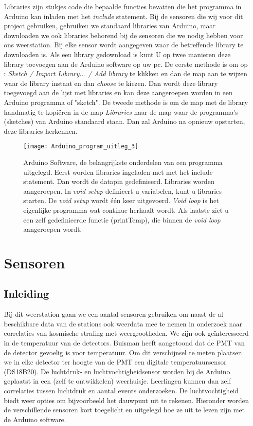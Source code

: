 Libraries zijn stukjes code die bepaalde functies bevatten die het
programma in Arduino kan inladen met het \emph{include} statement. Bij
de sensoren die wij voor dit project gebruiken, gebruiken we standaard
libraries van Arduino, maar downloaden we ook libraries behorend bij de
sensoren die we nodig hebben voor ons weerstation. Bij elke sensor wordt
aangegeven waar de betreffende library te downloaden is. Als een library
gedownload is kunt U op twee manieren deze library toevoegen aan de
Arduino software op uw pc. De eerste methode is om op : \emph{Sketch /
Import Library... / Add library} te klikken en dan de map aan te wijzen
waar de library instaat en dan \emph{choose} te kiezen. Dan wordt deze
library toegevoegd aan de lijst met libraries en kan deze aangeroepen
worden in een Arduino programma of "sketch". De tweede methode is om de
map met de library handmatig te kopi\"{e}ren in de map \emph{Libraries}
naar de map waar de programma's (sketches) van Arduino standaard staan.
Dan zal Arduino na opnieuw opstarten, deze libraries herkennen. 


\begin{figure}
    \centering
    \texttt{[image: Arduino\_program\_uitleg\_3]}
    \caption{Arduino Software, de belangrijkste onderdelen van een 
    programma uitgelegd. Eerst worden libraries ingeladen met 
    met het include statement. Dan wordt de datapin gedefinieerd.
    Libraries worden aangeroepen. In \emph{void setup} definieert u variabelen, 
    kunt u libraries starten. De \emph{void setup} wordt één keer uitgevoerd. 
    \emph{Void loop} is het eigenlijke programma wat continue herhaalt wordt. 
    Als laatste ziet u een zelf gedefinieerde functie (printTemp), die binnen 
    de \emph{void loop} aangeroepen wordt.}
   \label{fig:Arduino_program_uitleg_3}
\end{figure}


\section{Sensoren}

\subsection{Inleiding}

Bij dit weerstation gaan we een aantal sensoren gebruiken om naast de al
beschikbare data van de \hisparc stations ook weerdata mee te nemen in
onderzoek naar correlaties van kosmische straling met weergrootheden. We
zijn ook ge\"{i}nteresseerd in de temperatuur van de detectors.
Buisman \cite{Buisman} heeft aangetoond dat de PMT van de detector gevoelig is
voor temperatuur. Om dit verschijnsel te meten plaatsen we in elke detector 
ter hoogte van de PMT een digitale temperatuursensor (DS18B20). De luchtdruk- 
en luchtvochtigheidsensor worden bij de Arduino geplaatst in een (zelf te
ontwikkelen) weerhuisje. Leerlingen kunnen dan zelf correlaties tussen
luchtdruk en aantal events onderzoeken. De luchtvochtigheid biedt weer
opties om bijvoorbeeld het dauwpunt uit te rekenen. Hieronder worden de
verschillende sensoren kort toegelicht en uitgelegd hoe ze uit te lezen
zijn met de Arduino software. 


